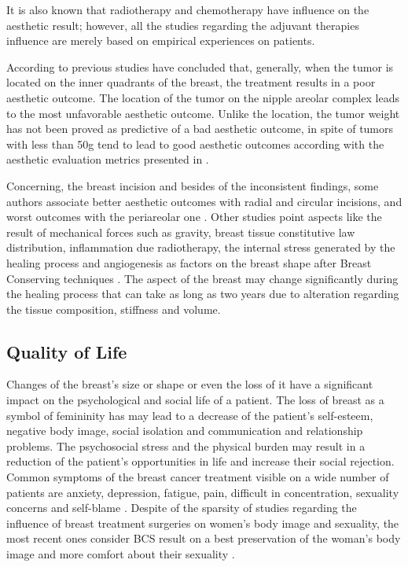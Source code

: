 It is also known that radiotherapy and chemotherapy have influence on the aesthetic result; however, all the studies regarding the adjuvant therapies influence are merely based on empirical experiences on patients.

According to \citet{Foersterling2014} previous studies have concluded that, generally, when the tumor is located on the inner quadrants of the breast, the treatment results in a poor aesthetic outcome. The location of the tumor on the nipple areolar complex leads to the most unfavorable aesthetic outcome. Unlike the location, the tumor weight has not been proved as predictive of a bad aesthetic outcome, in spite of tumors with less than 50g tend to lead to good aesthetic outcomes according with the aesthetic evaluation metrics presented in \cite{Joa2012}.

Concerning, the breast incision and besides of the inconsistent findings, some authors associate better aesthetic outcomes with radial and circular incisions, and worst outcomes with the periareolar one \cite{Foersterling2014}. Other studies point aspects like the result of mechanical forces such as gravity, breast tissue constitutive law distribution, inflammation due radiotherapy, the internal stress generated by the healing process and angiogenesis as factors on the breast shape after Breast Conserving techniques \cite{Vavourakis2016}. The aspect of the breast may change significantly during the healing process that can take as long as two years due to alteration regarding the tissue composition, stiffness and volume.

\subsection{Quality of Life}

Changes of the breast's size or shape or even the loss of it have a significant impact on the psychological and social life of a patient. The loss of breast as a symbol of femininity has may lead to a decrease of the patient's self-esteem, negative body image, social isolation and communication and relationship problems. The psychosocial stress and the physical burden may result in a reduction of the patient's opportunities in life and increase their social rejection. Common symptoms of the breast cancer treatment visible on a wide number of patients are anxiety, depression, fatigue, pain, difficult in concentration, sexuality concerns and self-blame \cite{Al-Azri2014}. Despite of the sparsity of studies regarding the influence of breast treatment surgeries on women's body image and sexuality, the most recent ones consider BCS result on a best preservation of the woman's body image and more comfort about their sexuality \cite{Rowland2000}.

